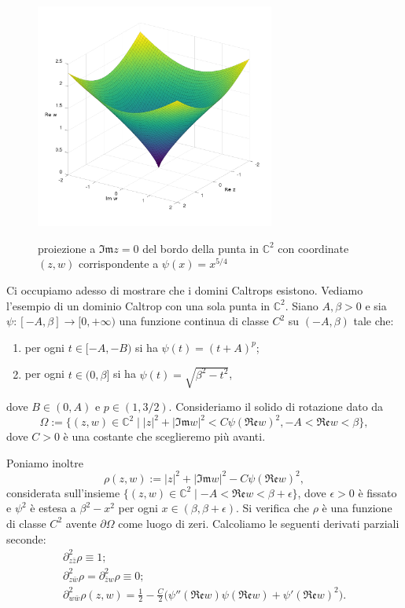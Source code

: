 \begin{figure}[h!]
    \begin{center}
        \includegraphics[width=0.7\textwidth, trim=0 4cm 0 2.5cm]{Immagini/caltrop.png} \\
        \caption{proiezione a $\mathfrak{Im}z=0$ del bordo della punta in $\mathbb{C}^2$ con coordinate $(z,w)$ corrispondente a $\psi(x)=x^{5/4}$}
    \end{center}
\end{figure}

Ci occupiamo adesso di mostrare che i domini Caltrops esistono. Vediamo l'esempio di un dominio Caltrop con una sola punta in $\mathbb{C}^2$. Siano $A,\beta>0$ e sia $\psi:[-A,\beta]\longrightarrow[0,+\infty)$ una funzione continua di classe $C^2$ su $(-A,\beta)$ tale che:
\begin{enumerate}[label={(\arabic*)}]
    \item per ogni $t\in[-A,-B)$ si ha $\psi(t)=(t+A)^p$;
    \item per ogni $t\in(0,\beta]$ si ha $\psi(t)=\sqrt{\beta^2-t^2}$,
\end{enumerate}
dove $B\in(0,A)$ e $p\in(1,3/2)$. Consideriamo il solido di rotazione dato da
$$\Omega:=\{(z,w)\in\mathbb{C}^2\mid |z|^2+|\mathfrak{Im}w|^2<C\psi(\mathfrak{Re}w)^2,-A<\mathfrak{Re}w<\beta\},$$
dove $C>0$ è una costante che sceglieremo più avanti.

Poniamo inoltre
$$\rho(z,w):=|z|^2+|\mathfrak{Im}w|^2-C\psi(\mathfrak{Re}w)^2,$$
considerata sull'insieme $\{(z,w)\in\mathbb{C}^2\mid -A<\mathfrak{Re}w<\beta+\epsilon\}$, dove $\epsilon>0$ è fissato e $\psi^2$ è estesa a $\beta^2-x^2$ per ogni $x\in(\beta,\beta+\epsilon)$. Si verifica che $\rho$ è una funzione di classe $C^2$ avente $\partial\Omega$ come luogo di zeri. Calcoliamo le seguenti derivati parziali seconde:
\begin{gather*}
    \partial^2_{z\bar{z}}\rho\equiv 1;\\
    \partial^2_{z\bar{w}}\rho=\partial^2_{\bar{z}w}\rho\equiv 0;\\
    \partial^2_{w\bar{w}}\rho(z,w)=\frac{1}{2}-\frac{C}{2}\big(\psi''(\mathfrak{Re}w)\psi(\mathfrak{Re}w)+\psi'(\mathfrak{Re}w)^2\big).
\end{gather*}

